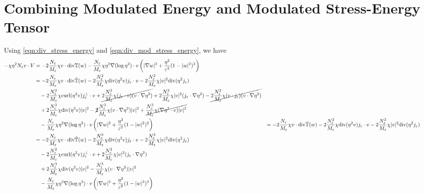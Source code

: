 \documentclass[a4paper]{article}
\newcommand{\curl}{\mathrm{curl}}
\renewcommand{\div}{\mathrm{div}}
\begin{document}
\section{Combining Modulated Energy and Modulated Stress-Energy Tensor}
Using \eqref{eqn:div_stress_energy} and \eqref{eqn:div_mod_stress_energy}, we have
\begin{align}
  - \chi \eta^2 N_\varepsilon v \cdot V &= -2 \frac{N_\varepsilon}{M_\varepsilon} \chi v \cdot \div \mathbb{T}(w) - \frac{N_\varepsilon}{M_\varepsilon}
  \chi \eta^2 \nabla( \log \eta^2 ) \cdot v \left( | \nabla w |^2 + \frac{\eta^2}{\varepsilon^2} (1-|w|^2)^2 \right) \nonumber \\
  &= -2 \frac{N_\varepsilon}{M_\varepsilon} \chi v \cdot \div \tilde{\mathbb{T}}(w) - 2 \frac{N_\varepsilon^2}{M_\varepsilon} \chi \div(\eta^2v) j_\varepsilon
  \cdot v - 2 \frac{N_\varepsilon^2}{M_\varepsilon} \chi |v|^2 \div( \eta^2 j_\varepsilon ) \nonumber \\
  &\quad - 2 \frac{N_\varepsilon^2}{M_\varepsilon} \chi \curl(\eta^2 v) j_\varepsilon^\perp \cdot v + \cancel{ 2 \frac{N_\varepsilon^2}{M_\varepsilon} \chi
  (j_\varepsilon \cdot v) (v \cdot \nabla \eta^2) } + 2 \frac{N_\varepsilon^2}{M_\varepsilon} \chi |v|^2 (j_\varepsilon \cdot \nabla \eta^2) -
  \cancel{ 2 \frac{N_\varepsilon^2}{M_\varepsilon} \chi (v \cdot j_\varepsilon) (v \cdot \nabla \eta^2) } \nonumber \\
  &\quad + 2 \frac{N_\varepsilon^3}{M_\varepsilon} \chi \div (\eta^2 v)
  |v|^2 - \cancel{2} \frac{N_\varepsilon^3}{M_\varepsilon} \chi (v \cdot \nabla \eta^2) |v|^2 \nonumber + \cancel{ \frac{N_\varepsilon^3}{M_\varepsilon} \chi ( \nabla
  \eta^2 \cdot v ) |v|^2 } \nonumber \\
  &\quad - \frac{N_\varepsilon}{M_\varepsilon} \chi \eta^2 \nabla( \log \eta^2 ) \cdot v \left( | \nabla w |^2 + \frac{\eta^2}{\varepsilon^2} (1-|w|^2)^2 \right)
  &= -2 \frac{N_\varepsilon}{M_\varepsilon} \chi v \cdot \div \tilde{\mathbb{T}}(w) - 2 \frac{N_\varepsilon^2}{M_\varepsilon} \chi \div(\eta^2v) j_\varepsilon
  \cdot v - 2 \frac{N_\varepsilon^2}{M_\varepsilon} \chi |v|^2 \div( \eta^2 j_\varepsilon ) \nonumber \\
  &= -2 \frac{N_\varepsilon}{M_\varepsilon} \chi v \cdot \div \tilde{\mathbb{T}}(w) - 2 \frac{N_\varepsilon^2}{M_\varepsilon} \chi \div(\eta^2v) j_\varepsilon
  \cdot v - 2 \frac{N_\varepsilon^2}{M_\varepsilon} \chi |v|^2 \div( \eta^2 j_\varepsilon ) \nonumber \\
  &\quad - 2 \frac{N_\varepsilon^2}{M_\varepsilon} \chi \curl(\eta^2 v) j_\varepsilon^\perp \cdot v + 2 \frac{N_\varepsilon^2}{M_\varepsilon} \chi |v|^2 (j_\varepsilon \cdot \nabla \eta^2) \nonumber \\
  &\quad + 2 \frac{N_\varepsilon^3}{M_\varepsilon} \chi \div (\eta^2 v)
  |v|^2 - \frac{N_\varepsilon^3}{M_\varepsilon} \chi (v \cdot \nabla \eta^2) |v|^2 \nonumber \nonumber \\
  &\quad - \frac{N_\varepsilon}{M_\varepsilon} \chi \eta^2 \nabla( \log \eta^2 ) \cdot v \left( | \nabla w |^2 + \frac{\eta^2}{\varepsilon^2} (1-|w|^2)^2 \right)
  \label{eqn:substitution1}
\end{align}
\end{document}
